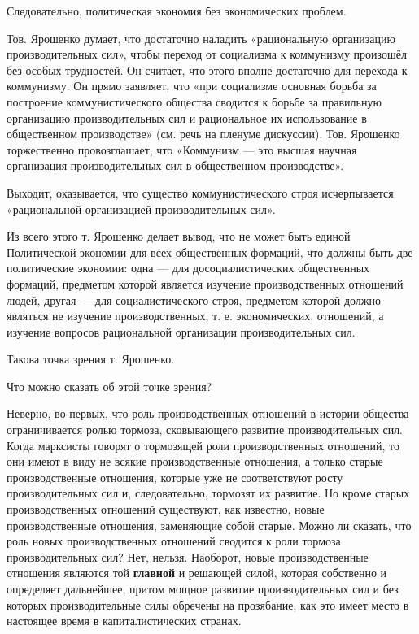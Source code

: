 \documentclass[12pt, a4paper, openany]{book}
\begin{document}
Следовательно, политическая экономия без экономических проблем.



Тов. Ярошенко думает, что достаточно наладить «рациональную организацию производительных сил», чтобы переход от социализма к коммунизму произошёл без особых трудностей. Он считает, что этого вполне достаточно для перехода к коммунизму. Он прямо заявляет, что «при социализме основная борьба за построение коммунистического общества сводится к борьбе за правильную организацию производительных сил и рациональное их использование в общественном производстве» (см. речь на пленуме дискуссии). Тов. Ярошенко торжественно провозглашает, что «Коммунизм — это высшая научная организация производительных сил в общественном производстве».



Выходит, оказывается, что существо коммунистического строя исчерпывается «рациональной организацией производительных сил».



Из всего этого т. Ярошенко делает вывод, что не может быть единой Политической экономии для всех общественных формаций, что должны быть две политические экономии: одна — для досоциалистических общественных формаций, предметом которой является изучение производственных отношений людей, другая — для социалистического строя, предметом которой должно являться не изучение производственных, т. е. экономических, отношений, а изучение вопросов рациональной организации производительных сил.



Такова точка зрения т. Ярошенко.



Что можно сказать об этой точке зрения?



Неверно, во-первых, что роль производственных отношений в истории общества ограничивается ролью тормоза, сковывающего развитие производительных сил. Когда марксисты говорят о тормозящей роли производственных отношений, то они имеют в виду не всякие производственные отношения, а только старые производственные отношения, которые уже не соответствуют росту производительных сил и, следовательно, тормозят их развитие. Но кроме старых производственных отношений существуют, как известно, новые производственные отношения, заменяющие собой старые. Можно ли сказать, что роль новых производственных отношений сводится к роли тормоза производительных сил? Нет, нельзя. Наоборот, новые производственные отношения являются той \textbf{главной} и решающей силой, которая собственно и определяет дальнейшее, притом мощное развитие производительных сил и без которых производительные силы обречены на прозябание, как это имеет место в настоящее время в капиталистических странах.
\end{document}
